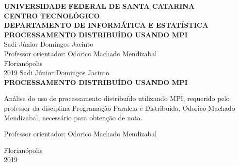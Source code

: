 \documentclass[12pt,a4paper,brazil,abntex2]{article}
\begin{document}
\singlespacing
\begin{titlepage}
\begin{center}
\begin{figure}[!htb]
\center
\end{figure}
{\bf  UNIVERSIDADE FEDERAL DE SANTA CATARINA}\\[0.2cm]
{\bf CENTRO TECNOLÓGICO}\\[0.2cm]
{\bf  DEPARTAMENTO DE INFORMÁTICA E ESTATÍSTICA}\\[5.5cm]
{\bf \large PROCESSAMENTO DISTRIBUÍDO USANDO MPI}\\[3.6 cm]
{Sadi Júnior Domingos Jacinto}\\[1cm]
{Professor orientador: Odorico Machado Mendizabal}\\[4.9 cm]
{Florianópolis}\\[0.2cm]
{2019}
\newpage
\thispagestyle{empty}
{Sadi Júnior Domingos Jacinto}\\[9cm]
{\bf \large PROCESSAMENTO DISTRIBUÍDO USANDO MPI}\\[0.5cm]
    \begin{flushright}
    \begin{list}{}{
      \setlength{\leftmargin}{7.2cm}
      \setlength{\rightmargin}{0cm}
      \setlength{\labelwidth}{0pt}
      \setlength{\labelsep}{\leftmargin}}
      \item Análise do uso de processamento distribuído utilizando MPI, requerido pelo professor da disciplina Programação Paralela e Distribuída, Odorico Machado Mendizabal, necessário para obtenção de nota.\\[0.2 cm] 
      \setlength{\labelsep}{\leftmargin}
      \item Professor orientador: Odorico Machado Mendizabal\
      \\[9cm]
     \end{list}
	 \end{flushright}
{Florianópolis}\\[0.2cm]
{2019}
\end{center}
\end{titlepage} %
\newpage
\thispagestyle{empty}
\tableofcontents








\end{document}
